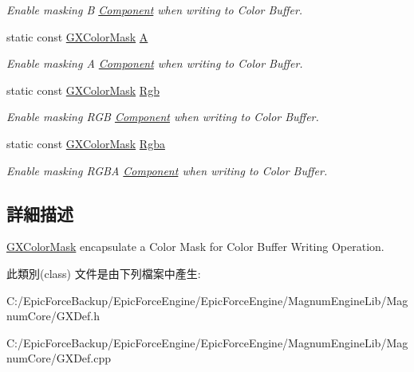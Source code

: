 \begin{DoxyCompactItemize}
\begin{DoxyCompactList}\small\item\em Enable masking B \hyperlink{class_magnum_1_1_component}{Component} when writing to Color Buffer. \end{DoxyCompactList}\item 
static const \hyperlink{class_magnum_1_1_g_x_color_mask}{G\+X\+Color\+Mask} \hyperlink{class_magnum_1_1_g_x_color_mask_aa328696e7c9a6586f4858f998b56414d}{A}\hypertarget{class_magnum_1_1_g_x_color_mask_aa328696e7c9a6586f4858f998b56414d}{}\label{class_magnum_1_1_g_x_color_mask_aa328696e7c9a6586f4858f998b56414d}

\begin{DoxyCompactList}\small\item\em Enable masking A \hyperlink{class_magnum_1_1_component}{Component} when writing to Color Buffer. \end{DoxyCompactList}\item 
static const \hyperlink{class_magnum_1_1_g_x_color_mask}{G\+X\+Color\+Mask} \hyperlink{class_magnum_1_1_g_x_color_mask_aa4550fe5e5c3a87b03b00dc716d3a6a0}{Rgb}\hypertarget{class_magnum_1_1_g_x_color_mask_aa4550fe5e5c3a87b03b00dc716d3a6a0}{}\label{class_magnum_1_1_g_x_color_mask_aa4550fe5e5c3a87b03b00dc716d3a6a0}

\begin{DoxyCompactList}\small\item\em Enable masking R\+GB \hyperlink{class_magnum_1_1_component}{Component} when writing to Color Buffer. \end{DoxyCompactList}\item 
static const \hyperlink{class_magnum_1_1_g_x_color_mask}{G\+X\+Color\+Mask} \hyperlink{class_magnum_1_1_g_x_color_mask_a98ae7be3267cddc3d28b9bfe98482b30}{Rgba}\hypertarget{class_magnum_1_1_g_x_color_mask_a98ae7be3267cddc3d28b9bfe98482b30}{}\label{class_magnum_1_1_g_x_color_mask_a98ae7be3267cddc3d28b9bfe98482b30}

\begin{DoxyCompactList}\small\item\em Enable masking R\+G\+BA \hyperlink{class_magnum_1_1_component}{Component} when writing to Color Buffer. \end{DoxyCompactList}\end{DoxyCompactItemize}


\subsection{詳細描述}
\hyperlink{class_magnum_1_1_g_x_color_mask}{G\+X\+Color\+Mask} encapsulate a Color Mask for Color Buffer Writing Operation. 

此類別(class) 文件是由下列檔案中產生\+:\begin{DoxyCompactItemize}
\item 
C\+:/\+Epic\+Force\+Backup/\+Epic\+Force\+Engine/\+Epic\+Force\+Engine/\+Magnum\+Engine\+Lib/\+Magnum\+Core/G\+X\+Def.\+h\item 
C\+:/\+Epic\+Force\+Backup/\+Epic\+Force\+Engine/\+Epic\+Force\+Engine/\+Magnum\+Engine\+Lib/\+Magnum\+Core/G\+X\+Def.\+cpp\end{DoxyCompactItemize}
